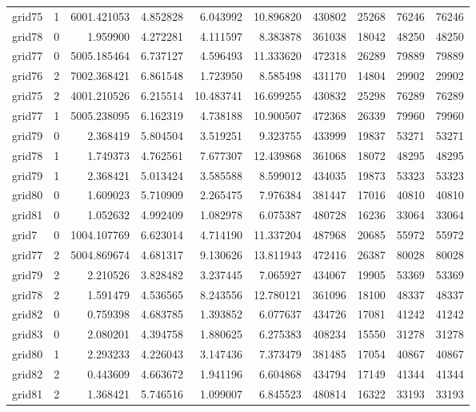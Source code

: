\begin{longtable}{|l|r|r|r|r|r|r|r|r|r|}
grid75 & 1 & 6001.421053 & 4.852828 & 6.043992 & 10.896820 & 430802 & 25268 & 76246 & 76246 \\
grid78 & 0 & 1.959900 & 4.272281 & 4.111597 & 8.383878 & 361038 & 18042 & 48250 & 48250 \\
grid77 & 0 & 5005.185464 & 6.737127 & 4.596493 & 11.333620 & 472318 & 26289 & 79889 & 79889 \\
grid76 & 2 & 7002.368421 & 6.861548 & 1.723950 & 8.585498 & 431170 & 14804 & 29902 & 29902 \\
grid75 & 2 & 4001.210526 & 6.215514 & 10.483741 & 16.699255 & 430832 & 25298 & 76289 & 76289 \\
grid77 & 1 & 5005.238095 & 6.162319 & 4.738188 & 10.900507 & 472368 & 26339 & 79960 & 79960 \\
grid79 & 0 & 2.368419 & 5.804504 & 3.519251 & 9.323755 & 433999 & 19837 & 53271 & 53271 \\
grid78 & 1 & 1.749373 & 4.762561 & 7.677307 & 12.439868 & 361068 & 18072 & 48295 & 48295 \\
grid79 & 1 & 2.368421 & 5.013424 & 3.585588 & 8.599012 & 434035 & 19873 & 53323 & 53323 \\
grid80 & 0 & 1.609023 & 5.710909 & 2.265475 & 7.976384 & 381447 & 17016 & 40810 & 40810 \\
grid81 & 0 & 1.052632 & 4.992409 & 1.082978 & 6.075387 & 480728 & 16236 & 33064 & 33064 \\
grid7 & 0 & 1004.107769 & 6.623014 & 4.714190 & 11.337204 & 487968 & 20685 & 55972 & 55972 \\
grid77 & 2 & 5004.869674 & 4.681317 & 9.130626 & 13.811943 & 472416 & 26387 & 80028 & 80028 \\
grid79 & 2 & 2.210526 & 3.828482 & 3.237445 & 7.065927 & 434067 & 19905 & 53369 & 53369 \\
grid78 & 2 & 1.591479 & 4.536565 & 8.243556 & 12.780121 & 361096 & 18100 & 48337 & 48337 \\
grid82 & 0 & 0.759398 & 4.683785 & 1.393852 & 6.077637 & 434726 & 17081 & 41242 & 41242 \\
grid83 & 0 & 2.080201 & 4.394758 & 1.880625 & 6.275383 & 408234 & 15550 & 31278 & 31278 \\
grid80 & 1 & 2.293233 & 4.226043 & 3.147436 & 7.373479 & 381485 & 17054 & 40867 & 40867 \\
grid82 & 2 & 0.443609 & 4.663672 & 1.941196 & 6.604868 & 434794 & 17149 & 41344 & 41344 \\
grid81 & 2 & 1.368421 & 5.746516 & 1.099007 & 6.845523 & 480814 & 16322 & 33193 & 33193 \\

\end{longtable}
